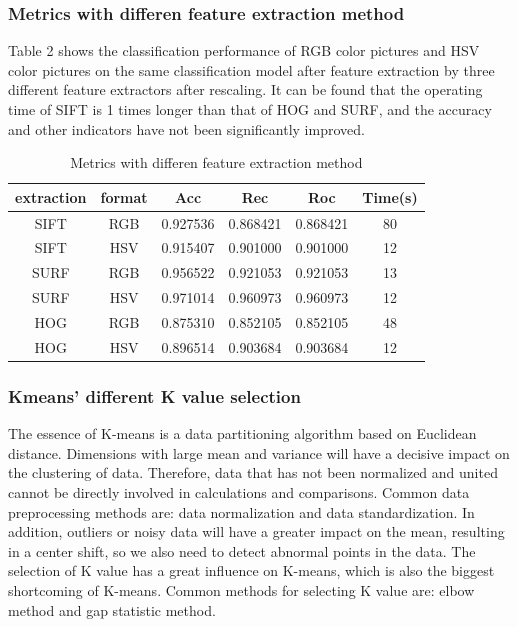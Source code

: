 \documentclass[conference]{IEEEtran}
\begin{document}
\subsubsection{Metrics with differen feature extraction method}
Table 2 shows the classification performance of RGB color pictures and HSV color pictures on the same classification model after feature extraction by three different feature extractors after rescaling. It can be found that the operating time of SIFT is 1 times longer than that of HOG and SURF, and the accuracy and other indicators have not been significantly improved.

\begin{table}[htbp]
\caption{Metrics with differen feature extraction method}
\begin{center}
\begin{tabular}{|c|c|c|c|c|c|}

\hline
extraction&format  &Acc&Rec &Roc&Time(s)\\
\hline
SIFT& RGB&0.927536 &0.868421   &0.868421 &80\\
\hline
SIFT& HSV&0.915407  &0.901000  &0.901000&12\\
\hline
SURF& RGB&0.956522 &0.921053   &0.921053 &13\\
\hline
SURF& HSV&0.971014 &0.960973   &0.960973 &12\\
\hline
HOG& RGB&0.875310&0.852105  &0.852105&48\\
\hline
HOG& HSV&0.896514 &0.903684  &0.903684&12\\
\hline

\end{tabular}
\label{tab2}
\end{center}
\end{table}


\subsubsection{Kmeans' different K value selection}

The essence of K-means is a data partitioning algorithm based on Euclidean distance. Dimensions with large mean and variance will have a decisive impact on the clustering of data. Therefore, data that has not been normalized and united cannot be directly involved in calculations and comparisons. Common data preprocessing methods are: data normalization and data standardization.
In addition, outliers or noisy data will have a greater impact on the mean, resulting in a center shift, so we also need to detect abnormal points in the data.
The selection of K value has a great influence on K-means, which is also the biggest shortcoming of K-means. Common methods for selecting K value are: elbow method and gap statistic method.
\end{document}
